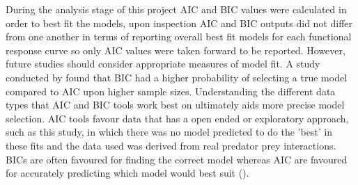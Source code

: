 \documentclass[11pt]{article}
\begin{document}
During the analysis stage of this project AIC and BIC values were calculated in order to best fit the models, upon inspection AIC and BIC outputs did not differ from one another in terms of reporting overall best fit models for each functional response curve so only AIC values were taken forward to be reported. However, future studies should consider appropriate measures of model fit. A study conducted by \cite{Aho2014} found that BIC had a higher probability of selecting a true model compared to AIC upon higher sample sizes. Understanding the different data types that AIC and BIC tools work best on ultimately aids more precise model selection. AIC tools favour data that has a open ended or exploratory approach, such as this study, in which there was no model predicted to do the 'best' in these fits and the data used was derived from real predator prey interactions. BICs are often favoured for finding the correct model whereas AIC are favoured for accurately predicting which model would best suit (\cite{Aho2014}). 
\end{document}
